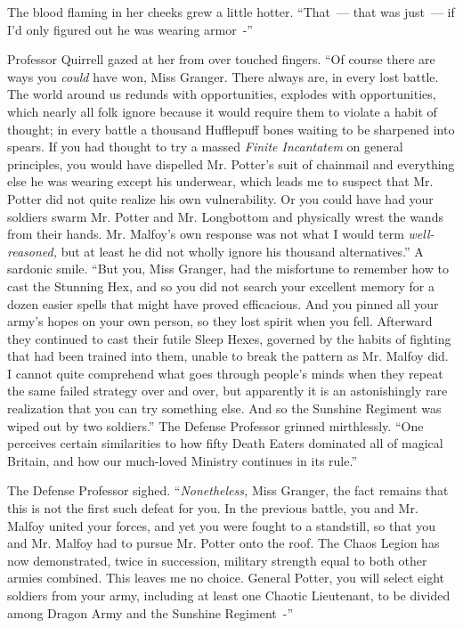 The blood flaming in her cheeks grew a little hotter. ``That~--- that was just~--- if I'd only figured out he was wearing armor~-''

Professor Quirrell gazed at her from over touched fingers. ``Of course there are ways you \emph{could} have won, Miss Granger. There always are, in every lost battle. The world around us redunds with opportunities, explodes with opportunities, which nearly all folk ignore because it would require them to violate a habit of thought; in every battle a thousand Hufflepuff bones waiting to be sharpened into spears. If you had thought to try a massed \emph{Finite Incantatem} on general principles, you would have dispelled Mr. Potter's suit of chainmail and everything else he was wearing except his underwear, which leads me to suspect that Mr. Potter did not quite realize his own vulnerability. Or you could have had your soldiers swarm Mr. Potter and Mr. Longbottom and physically wrest the wands from their hands. Mr. Malfoy's own response was not what I would term \emph{well-reasoned,} but at least he did not wholly ignore his thousand alternatives.'' A sardonic smile. ``But you, Miss Granger, had the misfortune to remember how to cast the Stunning Hex, and so you did not search your excellent memory for a dozen easier spells that might have proved efficacious. And you pinned all your army's hopes on your own person, so they lost spirit when you fell. Afterward they continued to cast their futile Sleep Hexes, governed by the habits of fighting that had been trained into them, unable to break the pattern as Mr. Malfoy did. I cannot quite comprehend what goes through people's minds when they repeat the same failed strategy over and over, but apparently it is an astonishingly rare realization that you can try something else. And so the Sunshine Regiment was wiped out by two soldiers.'' The Defense Professor grinned mirthlessly. ``One perceives certain similarities to how fifty Death Eaters dominated all of magical Britain, and how our much-loved Ministry continues in its rule.''

The Defense Professor sighed. ``\emph{Nonetheless,} Miss Granger, the fact remains that this is not the first such defeat for you. In the previous battle, you and Mr. Malfoy united your forces, and yet you were fought to a standstill, so that you and Mr. Malfoy had to pursue Mr. Potter onto the roof. The Chaos Legion has now demonstrated, twice in succession, military strength equal to both other armies combined. This leaves me no choice. General Potter, you will select eight soldiers from your army, including at least one Chaotic Lieutenant, to be divided among Dragon Army and the Sunshine Regiment~-''

